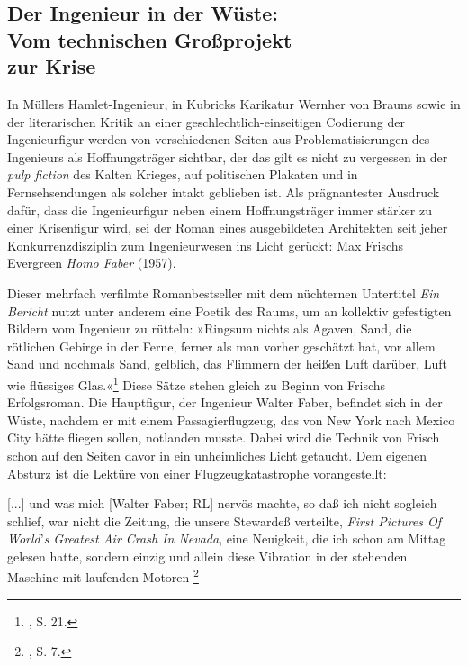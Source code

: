 \documentclass[%
	fontsize=10pt,%
	twoside,%
	headings=optiontoheadandtoc,%
	showtrims]{scrbook}
\renewenvironment{quote}{%
  \addmargin[\genericindent]{0pt}%
  \KOMAoptions{parskip=true}%
  \ifdim\parskip>0pt\else\addvspace{\intextsep}\fi
}{%
  \par
  \endaddmargin\vspace{\intextsep}
}
\begin{document}
\subsection[Der Ingenieur in der Wüste:    Vom technischen Großprojekt    zur Krise]{Der Ingenieur in der Wüste: \- \protect\\ Vom technischen Großprojekt \- \protect\\ zur Krise}
\par In Müllers Hamlet-Ingenieur, in Kubricks Karikatur Wernher von Brauns sowie in der literarischen Kritik an einer geschlechtlich-einseitigen Codierung der Ingenieurfigur werden von verschiedenen Seiten aus Problematisierungen des Ingenieurs als Hoffnungsträger sichtbar, der \textendash{} das gilt es nicht zu vergessen \textendash{} in der \emph{pulp fiction} des Kalten Krieges, auf politischen Plakaten und in Fernsehsendungen als solcher intakt geblieben ist. Als prägnantester Ausdruck dafür, dass die Ingenieurfigur neben einem Hoffnungsträger immer stärker zu einer Krisenfigur wird, sei der Roman eines ausgebildeten Architekten \textendash{} seit jeher Konkurrenzdisziplin zum Ingenieurwesen \textendash{} ins Licht gerückt: Max Frischs Evergreen \emph{Homo Faber} (1957).\par Dieser mehrfach verfilmte Romanbestseller mit dem nüchternen Untertitel \emph{Ein Bericht} nutzt unter anderem eine Poetik des Raums, um an kollektiv gefestigten Bildern vom Ingenieur zu rütteln: »Ringsum nichts als Agaven, Sand, die rötlichen Gebirge in der Ferne, ferner als man vorher geschätzt hat, vor allem Sand und nochmals Sand, gelblich, das Flimmern der heißen Luft darüber, Luft wie flüssiges Glas.«\footnote{\cite[][]{frisch1977a}, S. 21.}  Diese Sätze stehen gleich zu Beginn von Frischs Erfolgsroman. Die Hauptfigur, der Ingenieur Walter Faber, befindet sich in der Wüste, nachdem er mit einem Passagierflugzeug, das von New York nach Mexico City hätte fliegen sollen, notlanden musste. Dabei wird die Technik von Frisch schon auf den Seiten davor in ein unheimliches Licht getaucht. Dem eigenen Absturz ist die Lektüre von einer Flugzeugkatastrophe vorangestellt:\begin{quote}
\par {[}...{]} und was mich {[}Walter Faber; RL{]} nervös machte, so daß ich nicht sogleich schlief, war nicht die Zeitung, die unsere Stewardeß verteilte, \emph{First Pictures Of World}\textquoteright{}\emph{s Greatest Air Crash In Nevada}, eine Neuigkeit, die ich schon am Mittag gelesen hatte, sondern einzig und allein diese Vibration in der stehenden Maschine mit laufenden Motoren \textendash{}\footnote{\cite[][]{frisch1977a}, S. 7.} 
\end{quote}
\end{document}

